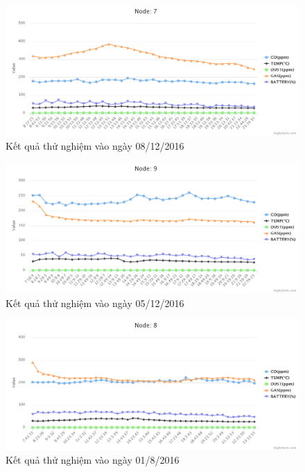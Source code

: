 \begin{figure}[H]
	\centering    
	\includegraphics[width=6in]{08dec}
	\caption[Kết quả thử nghiệm vào ngày 08/12/2016]{Kết quả thử nghiệm vào ngày 08/12/2016}
	\label{fig:08dec}
\end{figure}

\begin{figure}[H]
	\centering    
	\includegraphics[width=6in]{05dec_9}
	\caption[Kết quả thử nghiệm vào ngày 05/12/2016]{Kết quả thử nghiệm vào ngày 05/12/2016}
	\label{fig:05dec_9}
\end{figure}


\begin{figure}[H]
	\centering    
	\includegraphics[width=6in]{01dec_8}
	\caption[Kết quả thử nghiệm vào ngày 01/8/2016]{Kết quả thử nghiệm vào ngày 01/8/2016}
	\label{fig:01dec_8}
\end{figure}

